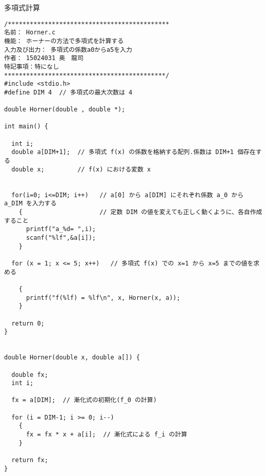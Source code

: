 \documentclass[a4j,titlepage]{jarticle}
\begin{document}
\begin{breakitembox}[l]{多項式計算} \small
\begin{verbatim}
/********************************************
名前： Horner.c
機能： ホーナーの方法で多項式を計算する
入力及び出力： 多項式の係数a0からa5を入力
作者： 15024031 奥　龍司
特記事項：特になし
********************************************/
#include <stdio.h>
#define DIM 4  // 多項式の最大次数は 4

double Horner(double , double *);

int main() {
  
  int i;
  double a[DIM+1];  // 多項式 f(x) の係数を格納する配列.係数は DIM+1 個存在する
  double x;         // f(x) における変数 x


  for(i=0; i<=DIM; i++)   // a[0] から a[DIM] にそれぞれ係数 a_0 から a_DIM を入力する
    {                     // 定数 DIM の値を変えても正しく動くように、各自作成すること
      printf("a_%d= ",i);
      scanf("%lf",&a[i]);
    }

  for (x = 1; x <= 5; x++)   // 多項式 f(x) での x=1 から x=5 までの値を求める

    {
      printf("f(%lf) = %lf\n", x, Horner(x, a));
    }
  
  return 0;
}


double Horner(double x, double a[]) {
  
  double fx;
  int i;
  
  fx = a[DIM];  // 漸化式の初期化(f_0 の計算)

  for (i = DIM-1; i >= 0; i--)
    {
      fx = fx * x + a[i];  // 漸化式による f_i の計算
    }
    
  return fx;
}

\end{verbatim}
\end{breakitembox}
\end{document}
